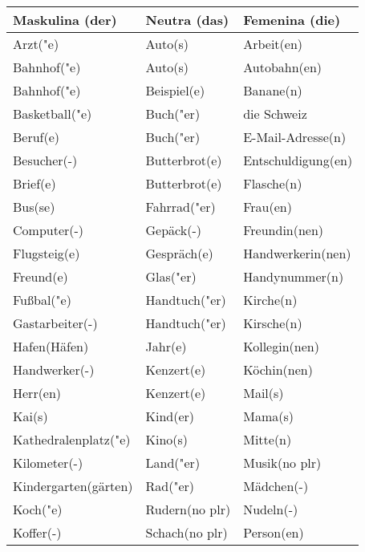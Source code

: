 \documentclass{article}
\renewcommand{\arraystretch}{1}
\begin{document}
\begin{table}[h!]
    \centering
    \label{tab:tabla1}
    \renewcommand{\arraystretch}{1.5}
    \begin{tabular}{|>{\raggedright\arraybackslash}p{5cm}|>{\raggedright\arraybackslash}p{5cm}|>{\raggedright\arraybackslash}p{5cm}|}
        \hline
        \rowcolor{gray!20} \textbf{Maskulina (der)} & \textbf{Neutra (das)} & \textbf{Femenina (die)} \\
        \hline
        Arzt("e) & Auto(s) & Arbeit(en) \\\hline
        Bahnhof("e) & Auto(s) & Autobahn(en) \\\hline
        Bahnhof("e) & Beispiel(e) & Banane(n) \\\hline
        Basketball("e) & Buch("er) & die Schweiz \\\hline
        Beruf(e) & Buch("er) & E-Mail-Adresse(n) \\\hline
        Besucher(-) & Butterbrot(e) & Entschuldigung(en) \\\hline
        Brief(e) & Butterbrot(e) & Flasche(n) \\\hline
        Bus(se) & Fahrrad("er) & Frau(en) \\\hline
        Computer(-) & Gepäck(-) & Freundin(nen) \\\hline
        Flugsteig(e) & Gespräch(e) & Handwerkerin(nen) \\\hline
        Freund(e) & Glas("er) & Handynummer(n) \\\hline
        Fu\ss{}bal("e) & Handtuch("er) & Kirche(n) \\\hline
        Gastarbeiter(-) & Handtuch("er) & Kirsche(n) \\\hline
        Hafen(Häfen) & Jahr(e) & Kollegin(nen) \\\hline
        Handwerker(-) & Kenzert(e) & Köchin(nen) \\\hline
        Herr(en) & Kenzert(e) & Mail(s) \\\hline
        Kai(s) & Kind(er) & Mama(s) \\\hline
        Kathedralenplatz("e) & Kino(s) & Mitte(n) \\\hline
        Kilometer(-) & Land("er) & Musik(no plr) \\\hline
        Kindergarten(gärten) & Rad("er) & Mädchen(-) \\\hline
        Koch("e) & Rudern(no plr) & Nudeln(-) \\\hline
        Koffer(-) & Schach(no plr) & Person(en) \\\hline

\end{tabular}
\end{table}
\end{document}
